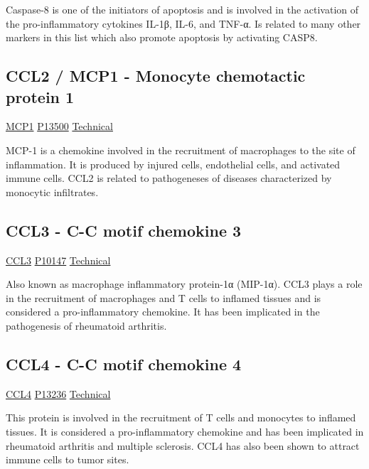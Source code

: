 Caspase-8 is one of the initiators of apoptosis and is involved in the activation of the pro-inflammatory cytokines IL-1β, IL-6, and TNF-α. Is related to many other markers in this list which also promote apoptosis by activating CASP8.

\subsection{CCL2 / MCP1 - Monocyte chemotactic protein 1}

\href{https://en.wikipedia.org/wiki/CCL2}{MCP1}
\href{http://www.uniprot.org/uniprot/P80075}{P13500}
\href{https://olink.com/products-services/target/protein/?assayID=5086}{Technical}

MCP-1 is a chemokine involved in the recruitment of macrophages to the site of inflammation. It is produced by injured cells, endothelial cells, and activated immune cells. CCL2 is related to pathogeneses of diseases characterized by monocytic infiltrates.

\subsection{CCL3 - C-C motif chemokine 3}

\href{https://en.wikipedia.org/wiki/CCL3}{CCL3}
\href{http://www.uniprot.org/uniprot/P10147}{P10147}
\href{https://olink.com/products-services/target/protein/?assayID=5097}{Technical}

Also known as macrophage inflammatory protein-1α (MIP-1α). CCL3 plays a role in the recruitment of macrophages and T cells to inflamed tissues and is considered a pro-inflammatory chemokine. It has been implicated in the pathogenesis of rheumatoid arthritis.

\subsection{CCL4 - C-C motif chemokine 4}

\href{https://en.wikipedia.org/wiki/CCL4}{CCL4}
\href{http://www.uniprot.org/uniprot/P13236}{P13236}
\href{https://olink.com/products-services/target/protein/?assayID=5048}{Technical}

This protein is involved in the recruitment of T cells and monocytes to inflamed tissues. It is considered a pro-inflammatory chemokine and has been implicated in  rheumatoid arthritis and multiple sclerosis. CCL4 has also been shown to attract immune cells to tumor sites.

